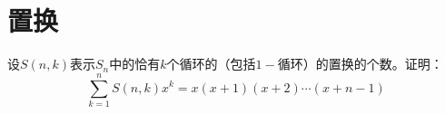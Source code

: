 \chapter{置换}
\begin{Ex}
  设$S(n,k)$表示$S_n$中的恰有$k$个循环的（包括$1-$循环）的置换的个数。证明：
  \[\sum_{k=1}^nS(n,k)x^k = x(x+1)(x+2)\cdots(x+n-1)\]
\end{Ex}
